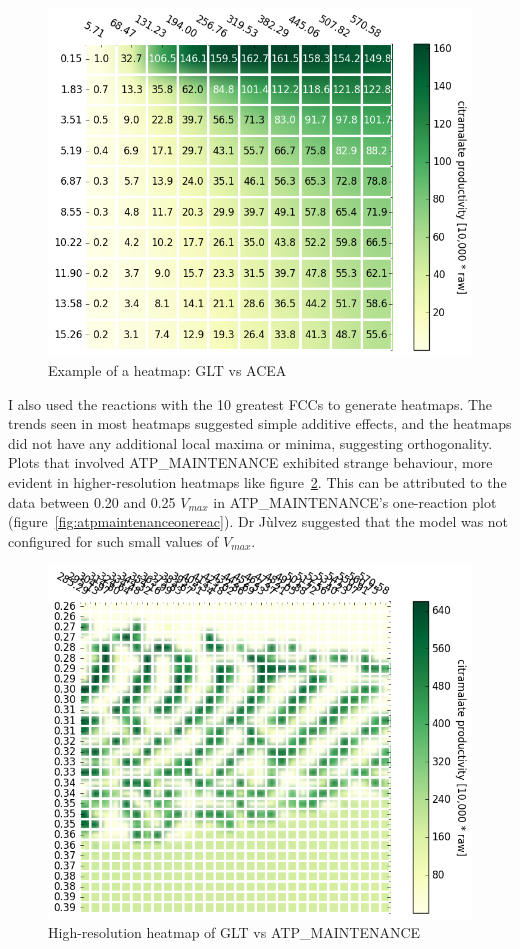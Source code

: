 \documentclass[parskip=full]{scrreprt}
\begin{document}
\begin{figure}[htbp]
  \centering
  \includegraphics[scale=0.5]{heatmapsample}
  \caption{Example of a heatmap: GLT vs ACEA}
  \label{fig:heatmapsample}
\end{figure}

I also used the reactions with the 10 greatest FCCs to generate heatmaps. The trends seen in most heatmaps suggested simple additive effects, and the heatmaps did not have any additional local maxima or minima, suggesting orthogonality. Plots that involved ATP\_MAINTENANCE exhibited strange behaviour, more evident in higher-resolution heatmaps like figure~\ref{fig:atpmaintenanceheatmap}. This can be attributed to the data between 0.20 and 0.25 $V_{max}$ in ATP\_MAINTENANCE's one-reaction plot (figure~\ref{fig:atpmaintenanceonereac}). Dr J\`ulvez suggested that the model was not configured for such small values of $V_{max}$.

\begin{figure}[htbp]
  \centering
  \includegraphics[scale=0.5]{atpmaintenanceheatmap}
  \caption{High-resolution heatmap of GLT vs ATP\_MAINTENANCE}
  \label{fig:atpmaintenanceheatmap}
\end{figure}
\end{document}
